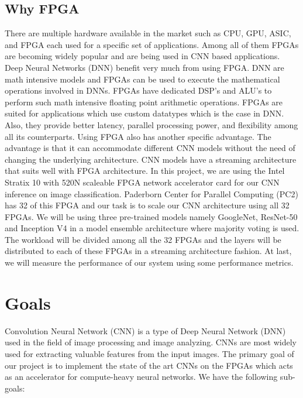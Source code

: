 \documentclass[titlepage]{report}
\begin{document}
\section{Why FPGA}
There are multiple hardware available in the market such as CPU, GPU, ASIC, and FPGA each used for a specific set of applications. Among all of them FPGAs are becoming widely popular and are being used in CNN based applications. Deep Neural Networks (DNN) benefit very much from using FPGA. DNN are math intensive models and FPGAs can be used to execute the mathematical operations involved in DNNs. FPGAs have dedicated DSP's and ALU's to perform such math intensive floating point arithmetic operations. FPGAs are suited for applications which use custom datatypes which is the case in DNN. Also, they provide better latency, parallel processing power, and flexibility among all its counterparts. Using FPGA also has another specific advantage. The advantage is that it can accommodate different CNN models without the need of changing the underlying architecture. CNN models have a streaming architecture that suits well with FPGA architecture.
In this project, we are using the Intel Stratix 10 with 520N scaleable FPGA network accelerator card for our CNN inference on image classification. Paderborn Center for Parallel Computing (PC2) has 32 of this FPGA and our task is to scale our CNN architecture using all 32 FPGAs. We will be using three pre-trained models namely GoogleNet, ResNet-50 and Inception V4 in a model ensemble architecture where majority voting is used. The workload will be divided among all the 32 FPGAs and the layers will be distributed to each of these FPGAs in a streaming architecture fashion. At last, we will measure the performance of our system using some performance metrics.





\chapter{Goals}
Convolution Neural Network (CNN) is a type of Deep Neural Network (DNN) used in the field of image processing and image analyzing. CNNs are most widely used for extracting valuable features from the input images. The primary goal of our project is to implement the state of the art CNNs on the FPGAs which acts as an accelerator for compute-heavy neural networks. We have the following sub-goals:
\end{document}
